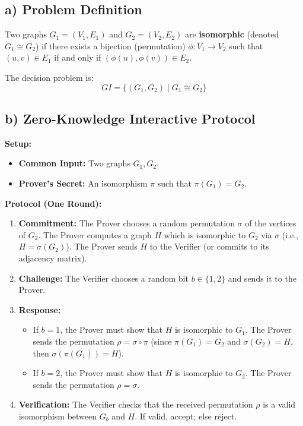 \documentclass[11pt]{article}
\begin{document}
\subsection*{a) Problem Definition}
Two graphs $G_1 = (V_1, E_1)$ and $G_2 = (V_2, E_2)$ are \textbf{isomorphic} (denoted $G_1 \cong G_2$) if there exists a bijection (permutation) $\phi: V_1 \to V_2$ such that $(u, v) \in E_1$ if and only if $(\phi(u), \phi(v)) \in E_2$.

The decision problem is:
\[
GI = \{ (G_1, G_2) \mid G_1 \cong G_2 \}
\]

\subsection*{b) Zero-Knowledge Interactive Protocol}
\textbf{Setup:}
\begin{itemize}
    \item \textbf{Common Input:} Two graphs $G_1, G_2$.
    \item \textbf{Prover's Secret:} An isomorphism $\pi$ such that $\pi(G_1) = G_2$.
\end{itemize}

\textbf{Protocol (One Round):}
\begin{enumerate}
    \item \textbf{Commitment:} The Prover chooses a random permutation $\sigma$ of the vertices of $G_2$. The Prover computes a graph $H$ which is isomorphic to $G_2$ via $\sigma$ (i.e., $H = \sigma(G_2)$). The Prover sends $H$ to the Verifier (or commits to its adjacency matrix).
    \item \textbf{Challenge:} The Verifier chooses a random bit $b \in \{1, 2\}$ and sends it to the Prover.
    \item \textbf{Response:}
    \begin{itemize}
        \item If $b=1$, the Prover must show that $H$ is isomorphic to $G_1$. The Prover sends the permutation $\rho = \sigma \circ \pi$ (since $\pi(G_1) = G_2$ and $\sigma(G_2) = H$, then $\sigma(\pi(G_1)) = H$).
        \item If $b=2$, the Prover must show that $H$ is isomorphic to $G_2$. The Prover sends the permutation $\rho = \sigma$.
    \end{itemize}
    \item \textbf{Verification:} The Verifier checks that the received permutation $\rho$ is a valid isomorphism between $G_b$ and $H$. If valid, accept; else reject.
\end{enumerate}
\end{document}
